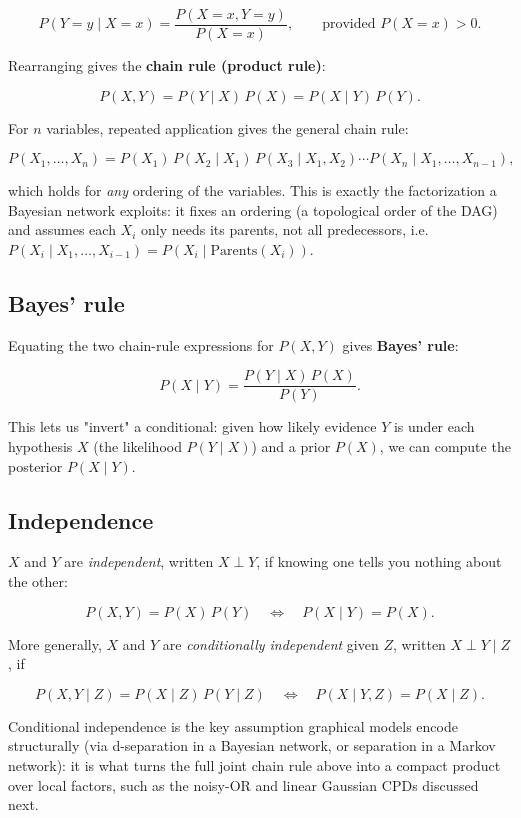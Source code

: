 \documentclass[11pt]{article}
\begin{document}
\[
P(Y = y \mid X = x) = \frac{P(X = x, Y = y)}{P(X = x)}, \qquad \text{provided } P(X=x) > 0.
\]

Rearranging gives the \textbf{chain rule (product rule)}:

\[
P(X, Y) = P(Y \mid X)\, P(X) = P(X \mid Y)\, P(Y).
\]

For $n$ variables, repeated application gives the general chain rule:

\[
P(X_1, \dots, X_n) = P(X_1) \, P(X_2 \mid X_1) \, P(X_3 \mid X_1, X_2) \cdots P(X_n \mid X_1, \dots, X_{n-1}),
\]

which holds for \emph{any} ordering of the variables. This is exactly the
factorization a Bayesian network exploits: it fixes an ordering (a topological
order of the DAG) and assumes each $X_i$ only needs its parents, not all
predecessors, i.e. $P(X_i \mid X_1, \dots, X_{i-1}) = P(X_i \mid \text{Parents}(X_i))$.

\subsection{Bayes' rule}

Equating the two chain-rule expressions for $P(X,Y)$ gives \textbf{Bayes' rule}:

\[
P(X \mid Y) = \frac{P(Y \mid X)\, P(X)}{P(Y)} .
\]

This lets us "invert" a conditional: given how likely evidence $Y$ is under
each hypothesis $X$ (the likelihood $P(Y \mid X)$) and a prior $P(X)$, we can
compute the posterior $P(X \mid Y)$.

\subsection{Independence}

$X$ and $Y$ are \emph{independent}, written $X \perp Y$, if knowing one tells
you nothing about the other:

\[
P(X, Y) = P(X)\, P(Y) \quad \Longleftrightarrow \quad P(X \mid Y) = P(X).
\]

More generally, $X$ and $Y$ are \emph{conditionally independent} given $Z$,
written $X \perp Y \mid Z$, if

\[
P(X, Y \mid Z) = P(X \mid Z)\, P(Y \mid Z) \quad \Longleftrightarrow \quad P(X \mid Y, Z) = P(X \mid Z).
\]

Conditional independence is the key assumption graphical models encode
structurally (via d-separation in a Bayesian network, or separation in a
Markov network): it is what turns the full joint chain rule above into a
compact product over local factors, such as the noisy-OR and linear Gaussian
CPDs discussed next.
\end{document}
